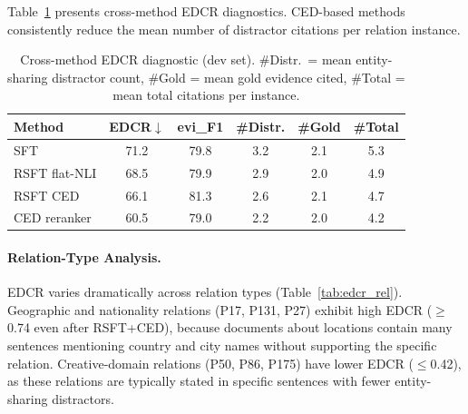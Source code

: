 \documentclass[11pt,a4paper]{article}
\begin{document}
Table~\ref{tab:edcr_diag} presents cross-method EDCR diagnostics. CED-based methods consistently reduce the mean number of distractor citations per relation instance.

\begin{table}[t]
\centering
\small
\begin{tabular}{lccccc}
\toprule
\textbf{Method} & \textbf{EDCR}$\downarrow$ & \textbf{evi\_F1} & \textbf{\#Distr.} & \textbf{\#Gold} & \textbf{\#Total} \\
\midrule
SFT & 71.2 & 79.8 & 3.2 & 2.1 & 5.3 \\
RSFT flat-NLI & 68.5 & 79.9 & 2.9 & 2.0 & 4.9 \\
RSFT CED & 66.1 & 81.3 & 2.6 & 2.1 & 4.7 \\
CED reranker & 60.5 & 79.0 & 2.2 & 2.0 & 4.2 \\
\bottomrule
\end{tabular}
\caption{Cross-method EDCR diagnostic (dev set). \#Distr.\ = mean entity-sharing distractor count, \#Gold = mean gold evidence cited, \#Total = mean total citations per instance.}
\label{tab:edcr_diag}
\end{table}

\paragraph{Relation-Type Analysis.}
EDCR varies dramatically across relation types (Table~\ref{tab:edcr_rel}). Geographic and nationality relations (P17, P131, P27) exhibit high EDCR ($\geq$0.74 even after RSFT+CED), because documents about locations contain many sentences mentioning country and city names without supporting the specific relation. Creative-domain relations (P50, P86, P175) have lower EDCR ($\leq$0.42), as these relations are typically stated in specific sentences with fewer entity-sharing distractors.
\end{document}
